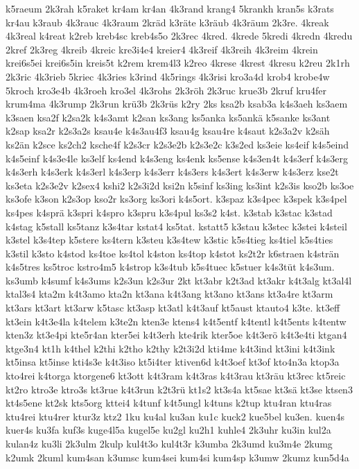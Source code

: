 {k5raeum
2k3rah
k5raket
kr4am
kr4an
4k3rand
krang4
5krankh
kran5s
k3rats
kr4au
k3raub
4k3rauc
4k3raum
2kräd
k3räte
k3räub
4k3räum
2k3re.
4kreak
4k3real
k4reat
k2reb
kreb4sc
kreb4s5o
2k3rec
4kred.
4krede
5kredi
4kredn
4kredu
2kref
2k3reg
4kreib
4kreic
kre3i4e4
kreier4
4k3reif
4k3reih
4k3reim
4krein
krei6s5ei
krei6s5in
kreis5t
k2rem
krem4l3
k2reo
4krese
4krest
4kresu
k2reu
2k1rh
2k3ric
4k3rieb
5kriec
4k3ries
k3rind
4k5rings
4k3risi
kro3a4d
krob4
krobe4w
5kroch
kro3e4b
4k3roeh
kro3el
4k3rohs
2k3röh
2k3ruc
krue3b
2kruf
kru4fer
krum4ma
4k3rump
2k3run
krü3b
2k3rüs
k2ry
2ks
ksa2b
ksab3a
k4s3aeh
ks3aem
k3saen
ksa2f
k2sa2k
k4s3amt
k2san
ks3ang
ks5anka
ks5ankä
k5sanke
ks3ant
k2sap
ksa2r
k2s3a2s
ksau4e
k4s3au4f3
ksau4g
ksau4re
k4saut
k2s3a2v
k2säh
ks2än
k2sce
ks2ch2
ksche4f
k2s3cr
k2s3e2b
k2s3e2c
k3s2ed
ks3eie
ks4eif
k4s5eind
k4s5einf
k4s3e4le
ks3elf
ks4end
k4s3eng
ks4enk
ks5ense
k4s3en4t
k4s3erf
k4s3erg
k4s3erh
k4s3erk
k4s3erl
k4s3erp
k4s3err
k4s3ers
k4s3ert
k4s3erw
k4s3erz
kse2t
ks3eta
k2s3e2v
k2sex4
kshi2
k2s3i2d
ksi2n
k5sinf
ks3ing
ks3int
k2s3is
kso2b
ks3oe
ks3ofe
k3son
k2s3op
kso2r
ks3org
ks3ori
k4s5ort.
k3spaz
k3s4pec
k3spek
k3s4pel
ks4pes
k4sprä
k3spri
k4spro
k3spru
k3s4pul
ks3s2
k4st.
k3stab
k3stac
k3stad
k4stag
k5stall
ks5tanz
k3s4tar
kstat4
ks5tat.
kstatt5
k3stau
k3stec
k3stei
k4steil
k3stel
k3s4tep
k5stere
ks4tern
k3steu
k3s4tew
k3stic
k5s4tieg
ks4tiel
k5s4ties
k3stil
k3sto
k4stod
ks4toe
ks4tol
k4ston
ks4top
k4stot
ks2t2r
k6straen
k4strän
k4s5tres
ks5troc
kstro4m5
k4strop
k3s4tub
k5s4tuec
k5stuer
k4s3tüt
k4s3um.
ks3umb
k4sumf
k4s3ums
k2s3un
k2s3ur
2kt
kt3abr
k2t3ad
kt3akr
k4t3alg
kt3al4l
ktal3s4
kta2m
k4t3amo
kta2n
kt3ana
k4t3ang
kt3ano
kt3ans
kt3a4re
kt3arm
kt3ars
kt3art
kt3arw
k5tasc
kt3asp
kt3atl
k4t3auf
kt5aust
ktauto4
k3te.
kt3eff
kt3ein
k4t3e4la
k4telem
k3te2n
kten3e
ktens4
k4t5entf
k4tentl
k4t5ents
k4tentw
kten3z
kt3e4pi
kte5r4an
kter5ei
k4t3erh
kte4rik
kter5oe
k4t3erö
k4t3e4ti
ktgan4
ktge3n4
kt1h
k4thel
k2thi
k2tho
k2thy
k2t3i2d
kti4me
k4t3ind
kt3ini
k4t3ink
kt5insa
kt5inse
kti4s3e
k4t3iso
kt5i4ter
ktiven6d
k4t3oef
kt3of
kto4n3a
ktop3a
kto4rei
k4torga
ktorgene6
kt3ott
k4t3ram
k4t3ras
k4t3rau
kt3räu
kt3rec
kt5reic
kt2ro
ktro3e
ktro3s
kt3rue
k4t3run
k2t3rü
kt1s2
kt3s4a
kt5sae
kt3sä
kt3se
ktsen3
kt4s5ene
kt2sk
kts5org
kttei4
k4tunf
k4t5ungl
k4tuns
k2tup
ktu4ran
ktu4ras
ktu4rei
ktu4rer
ktur3z
ktz2
1ku
ku4al
ku3an
ku1c
kuck2
kue5bel
ku3en.
kuen4s
kuer4s
ku3fa
kuf3s
kuge4l5a
kugel5e
ku2gl
ku2h1
kuhle4
2k3uhr
ku3in
kul2a
kulan4z
ku3li
2k3ulm
2kulp
kul4t3o
kul4t3r
k3umba
2k3umd
ku3m4e
2kumg
k2umk
2kuml
kum4san
k3umsc
kum4sei
kum4si
kum4sp
k3umw
2kumz
kun5d4a
}

